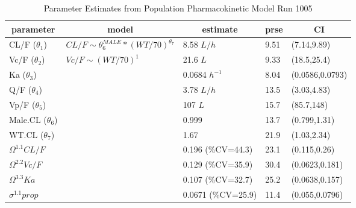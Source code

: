 %
\begin{table}[ht]
 \caption[Model 10o5 Parameters]{Parameter Estimates from Population Pharmacokinetic Model Run 1005\label{p1005}} 
 \begin{center}
 \begin{tabular}{lllll}\hline\hline
\multicolumn{1}{c}{parameter}&\multicolumn{1}{c}{model}&\multicolumn{1}{c}{estimate}&\multicolumn{1}{c}{prse}&\multicolumn{1}{c}{CI}\tabularnewline
\hline
CL/F ($\theta_1$)&$CL/F \sim \theta_6^{MALE} * (WT/70)^{\theta_7}$&8.58 $L/h$&9.51&(7.14,9.89)\tabularnewline
Vc/F ($\theta_2$)&$Vc/F \sim (WT/70)^{1}$&21.6 $L$&9.33&(18.5,25.4)\tabularnewline
Ka ($\theta_3$)&&0.0684 $h^{-1}$&8.04&(0.0586,0.0793)\tabularnewline
Q/F ($\theta_4$)&&3.78 $L/h$&13.5&(3.03,4.83)\tabularnewline
Vp/F ($\theta_5$)&&107 $L$&15.7&(85.7,148)\tabularnewline
Male.CL ($\theta_6$)&&0.999&13.7&(0.799,1.31)\tabularnewline
WT.CL ($\theta_7$)&&1.67&21.9&(1.03,2.34)\tabularnewline
$\Omega^{1.1}CL/F$&&0.196 (\%CV=44.3)&23.1&(0.115,0.26)\tabularnewline
$\Omega^{2.2}Vc/F$&&0.129 (\%CV=35.9)&30.4&(0.0623,0.181)\tabularnewline
$\Omega^{3.3}Ka$&&0.107 (\%CV=32.7)&25.2&(0.0638,0.157)\tabularnewline
$\sigma^{1.1}prop$&&0.0671 (\%CV=25.9)&11.4&(0.055,0.0796)\tabularnewline
\hline
\end{tabular}

\end{center}

\end{table}

